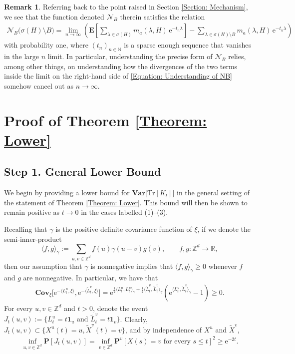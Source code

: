 \documentclass{amsart}
\numberwithin{equation}{section}
\theoremstyle{definition}
\newtheorem{remark}[theorem]{Remark}
\newcommand\ga{\gamma}
\newcommand\la{\lambda}
\newcommand\si{\sigma}
\newcommand\mbb{\mathbb}
\newcommand\mbf{\mathbf}
\newcommand\mc{\mathcal}
\newcommand\mr{\mathrm}
\begin{document}
%

\begin{remark}
\label{Remark: Mechanism}
Referring back to the point raised in Section \ref{Section: Mechanism},
we see that the function denoted $\mc N_B$ therein satisfies the relation
\begin{align}
\label{Equation: Understanding of NB}
\mc N_B\big(\si(H)\setminus B\big)=\lim_{n\to\infty}\left(\mbf E\left[\sum_{\la\in\si(H)}m_a(\la,H)\,\mr e^{-t_n\la}\right]
-\sum_{\la\in\si(H)\setminus B}m_a(\la,H)\,\mr e^{-t_n\la}\right)
\end{align}
with probability one, where $(t_n)_{n\in\mbb N}$ is a sparse enough
sequence that vanishes in the large $n$ limit. In particular, understanding the
precise form of $\mc N_B$ relies, among other things, on understanding
how the divergences of the two terms inside the limit on the right-hand side of
\eqref{Equation: Understanding of NB} somehow cancel out as $n\to\infty$.
\end{remark}

%

\section{Proof of Theorem \ref{Theorem: Lower}}
\label{sec: Proof of Lower}

%

\subsection{Step 1. General Lower Bound}

%

We begin by providing a lower bound for $\mbf{Var}\big[\mr{Tr}[K_t]\big]$
in the general setting of the statement of
Theorem \ref{Theorem: Lower}. This bound will then be shown to remain positive
as $t\to0$ in the cases labelled (1)--(3).


%

Recalling that $\ga$ is the positive definite covariance function of $\xi$,
if we denote the semi-inner-product
\[\langle f,g\rangle_\ga:=\sum_{u,v\in\mbb Z^d}f(u)\ga(u-v)g(v),\qquad f,g:\mbb Z^d\to\mbb R,\]
then our assumption that $\ga$ is nonnegative implies that $\langle f,g\rangle_\ga\geq0$
whenever $f$ and $g$ are nonnegative. In particular, we have that
\begin{align}
\label{Equation: Lower Bound - Covariance}
\mbf{Cov}_\xi\big[\mr e^{-\langle L^u_t,\xi\rangle},\mr e^{-\langle\tilde L^v_t,\xi\rangle}\big]
=\mr e^{\frac12\langle L_t^u,L_t^u\rangle_\ga+\frac12\langle\tilde L_t^v,\tilde L_t^v\rangle_\ga}\left(\mr e^{\langle L_t^u,\tilde L_t^v\rangle_\ga}-1\right)\geq0.
\end{align}
For every $u,v\in\mbb Z^d$ and $t>0$, denote the event
$J_t(u,v):=\{L^u_t=t\mbf 1_u\text{ and }\tilde L^v_t=t\mbf 1_v\}$.
Clearly, $J_t(u,v)\subset\{X^u(t)=u,\tilde X^v(t)=v\}$, and
by independence of $X^u$ and $\tilde X^v$,
\begin{align}
\label{Equation: Lower Bound - J_t Event}
\inf_{u,v\in\mbb Z^d}\mbf P[J_t(u,v)]=\inf_{v\in\mbb Z^d}\mbf P^v[X(s)=v\text{ for every }s\leq t]^2
\geq\mr e^{-2t}.
\end{align}
\end{document}
